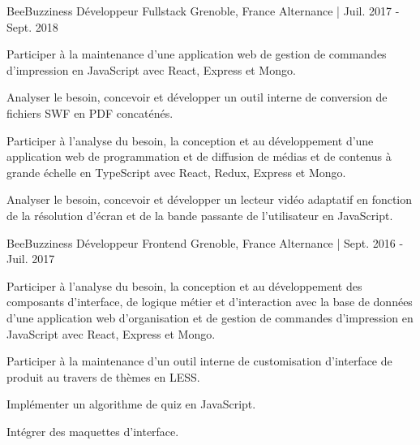 \begin{cventries}
  \cventry
  	{BeeBuzziness} %
    {Développeur Fullstack} %
    {Grenoble, France} %
    {Alternance | Juil. 2017 - Sept. 2018} %
    {
      \begin{cvitems} %
        \item {Participer à la maintenance d’une application web de gestion de commandes d'impression en JavaScript avec React, Express et Mongo.}
        \item {Analyser le besoin, concevoir et développer un outil interne de conversion de fichiers SWF en PDF concaténés.}
        \item {Participer à l’analyse du besoin, la conception et au développement d’une application web de programmation et de diffusion de médias et de contenus à grande échelle en TypeScript avec React, Redux, Express et Mongo.}
        \item {Analyser le besoin, concevoir et développer un lecteur vidéo adaptatif en fonction de la résolution d'écran et de la bande passante de l'utilisateur en JavaScript.}
      \end{cvitems}
    }

  \cventry
  	{BeeBuzziness} %
    {Développeur Frontend} %
    {Grenoble, France} %
    {Alternance | Sept. 2016 - Juil. 2017} %
    {
      \begin{cvitems} %
        \item {Participer à l’analyse du besoin, la conception et au développement des composants d’interface, de logique métier et d’interaction avec la base de données d'une application web d'organisation et de gestion de commandes d'impression en JavaScript avec React, Express et Mongo.}
        \item {Participer à la maintenance d’un outil interne de customisation d’interface de produit au travers de thèmes en LESS.}
        \item {Implémenter un algorithme de quiz en JavaScript.}
        \item {Intégrer des maquettes d’interface.}
      \end{cvitems}
    }

\end{cventries}
